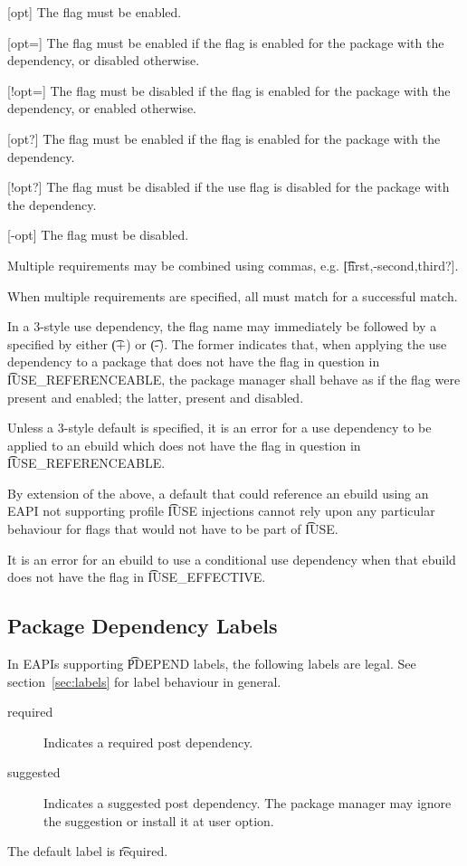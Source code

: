 \begin{description}
\item{[opt]} The flag must be enabled.
\item{[opt=]} The flag must be enabled if the flag is enabled for the package with the
    dependency, or disabled otherwise.
\item{[!opt=]} The flag must be disabled if the flag is enabled for the package with the
    dependency, or enabled otherwise.
\item{[opt?]} The flag must be enabled if the flag is enabled for the package with the
    dependency.
\item{[!opt?]} The flag must be disabled if the use flag is disabled for the package with the
    dependency.
\item{[-opt]} The flag must be disabled.
\end{description}

Multiple requirements may be combined using commas, e.g. \t{[first,-second,third?]}.

When multiple requirements are specified, all must match for a successful match.

In a 3-style use dependency, the flag name may immediately be followed by a  specified by
either \t{(+)} or \t{(-)}. The former indicates that, when applying the use dependency to a package
that does not have the flag in question in \t{IUSE\_REFERENCEABLE}, the package manager shall behave
as if the flag were present and enabled; the latter, present and disabled.

Unless a 3-style default is specified, it is an error for a use dependency to be applied to an
ebuild which does not have the flag in question in \t{IUSE\_REFERENCEABLE}.

\note By extension of the above, a default that could reference an ebuild using an EAPI not
supporting profile \t{IUSE} injections cannot rely upon any particular behaviour for flags that
would not have to be part of \t{IUSE}.

It is an error for an ebuild to use a conditional use dependency when that ebuild does not have the
flag in \t{IUSE\_EFFECTIVE}.

\IFKDEBUILDELSE
{
    \subsection{Package Dependency Labels}

    In EAPIs supporting \t{PDEPEND} labels, the following labels are legal. See
    section~\ref{sec:labels} for label behaviour in general.

    \begin{description}
    \item[required] Indicates a required post dependency.
    \item[suggested] Indicates a suggested post dependency. The package manager may ignore the
        suggestion or install it at user option.
    \end{description}

    The default label is \t{required}.
}{
}

